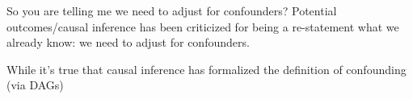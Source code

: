 \begin{frame}[c]{So you are telling me we need to adjust for confounders?}
Potential outcomes/causal inference has been criticized for being a re-statement what we already know: we need to adjust for confounders.
\bigskip

While it's true that causal inference has formalized the definition of confounding (via DAGs)
\end{frame}


%
%	    
